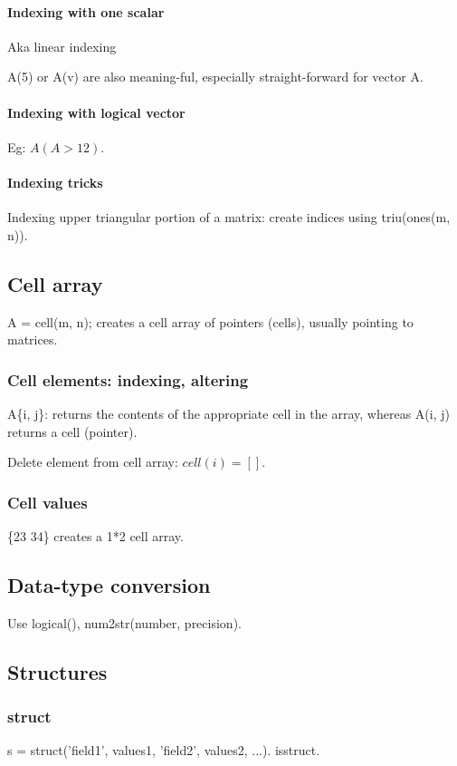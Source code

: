 \documentclass[oneside, article]{memoir}
\begin{document}
\paragraph*{Indexing with one scalar}
Aka linear indexing

A(5) or A(v) are also meaning-ful, especially straight-forward for vector A.

\paragraph*{Indexing with logical vector}
Eg: $A(A>12)$.

\paragraph*{Indexing tricks}
Indexing upper triangular portion of a matrix: create indices using triu(ones(m, n)).

\subsection{Cell array}
A = cell(m, n); creates a cell array of pointers (cells), usually pointing to matrices.

\subsubsection{Cell elements: indexing, altering}
A\{i, j\}: returns the contents of the appropriate cell in the array, whereas A(i, j) returns a cell (pointer).

Delete element from cell array: $cell(i) = []$.


\subsubsection{Cell values}
\{23 34\} creates a 1*2 cell array.

\subsection{Data-type conversion}
Use logical(), num2str(number, precision).

\subsection{Structures}
\subsubsection{struct}
s = struct('field1', values1, 'field2', values2, ...). isstruct.
\end{document}
